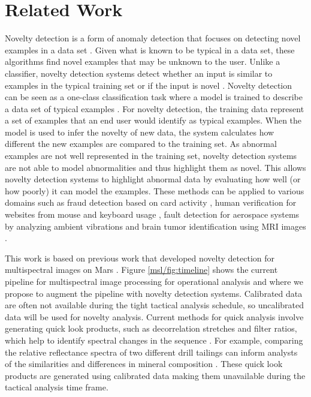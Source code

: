 \section{Related Work}
Novelty detection is a form of anomaly detection that focuses on detecting novel examples in a data set \parencite{domingues2019comparative}. 
Given what is known to be typical in a data set, these algorithms find novel examples that may be unknown to the user.
Unlike a classifier, novelty detection systems detect whether an input is similar to examples in the typical training set or if the input is novel \parencite{markou2003novelty}.
Novelty detection can be seen as a one-class classification task where a model is trained to describe a data set of typical examples \parencite{pimentel2014review}. 
For novelty detection, the training data represent a set of examples that an end user would identify as typical examples. 
When the model is used to infer the novelty of new data, the system calculates how different the new examples are compared to the training set. 
As abnormal examples are not well represented in the training set, novelty detection systems are not able to model abnormalities and thus highlight them as novel. 
This allows novelty detection systems to highlight abnormal data by evaluating how well (or how poorly) it can model the examples. 
These methods can be applied to various domains such as fraud detection based on card activity \parencite{oosterlinck2020one}, human verification for websites from mouse and keyboard usage \parencite{kim2018keystroke}, fault detection for aerospace systems by analyzing ambient vibrations \parencite{worden1997structural} and brain tumor identification using MRI images \parencite{wang2020brain}.

This work is based on previous work that developed novelty detection for multispectral images on Mars \parencite{kerner2020comparison}.
Figure \ref{msl/fig:timeline} shows the current pipeline for multispectral image processing for operational analysis and where we propose to augment the pipeline with novelty detection systems. 
Calibrated data are often not available during the tight tactical analysis schedule, so uncalibrated data will be used for novelty analysis. 
Current methods for quick analysis involve generating quick look products, such as decorrelation stretches and filter ratios, which help to identify spectral changes in the sequence \parencite{gillespie1986color}.
For example, comparing the relative reflectance spectra of two different drill tailings can inform analysts of the similarities and differences in mineral composition \parencite{wellington2017visible}.
These quick look products are generated using calibrated data making them unavailable during the tactical analysis time frame.  

